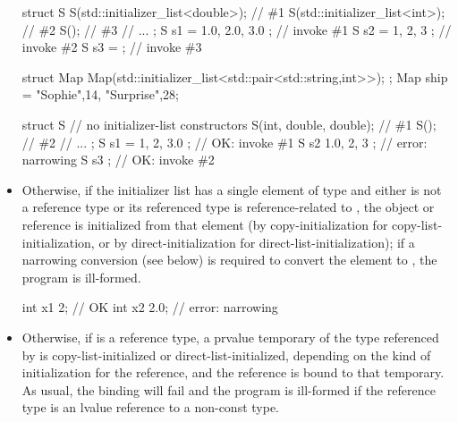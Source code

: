 \begin{itemize}
\enterexample
\begin{codeblock}
struct S {
  S(std::initializer_list<double>); // \#1
  S(std::initializer_list<int>);    // \#2
  S();                              // \#3
  // ...
};
S s1 = { 1.0, 2.0, 3.0 };           // invoke \#1
S s2 = { 1, 2, 3 };                 // invoke \#2
S s3 = { };                         // invoke \#3
\end{codeblock}
\exitexample

\enterexample
\begin{codeblock}
struct Map {
  Map(std::initializer_list<std::pair<std::string,int>>);
};
Map ship = {{"Sophie",14}, {"Surprise",28}};
\end{codeblock}
\exitexample

\enterexample
\begin{codeblock}
struct S {
  // no initializer-list constructors
  S(int, double, double);           // \#1
  S();                              // \#2
  // ...
};
S s1 = { 1, 2, 3.0 };               // OK: invoke \#1
S s2 { 1.0, 2, 3 };                 // error: narrowing
S s3 { };                           // OK: invoke \#2
\end{codeblock}
\exitexample

\item Otherwise, if
the initializer list has a single element of type  and either
 is not a reference type or its referenced type is
reference-related to , the object or reference is initialized
from that element (by copy-initialization for copy-list-initialization,
or by direct-initialization for direct-list-initialization);
if a narrowing conversion (see below) is required
to convert the element to , the program is ill-formed.

\enterexample
\begin{codeblock}
int x1 {2};                         // OK
int x2 {2.0};                       // error: narrowing
\end{codeblock}
\exitexample

\item Otherwise, if  is a reference type, a prvalue temporary of the type
referenced by  is copy-list-initialized or direct-list-initialized,
depending on the kind of initialization for the reference, and the reference is
bound to that temporary.
\enternote As usual, the binding will fail and the program is ill-formed if
the reference type is an lvalue reference to a non-const type. \exitnote


\end{itemize}
